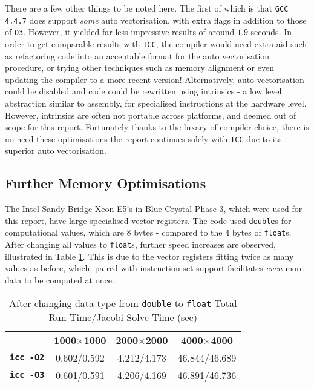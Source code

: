 \documentclass[10pt,twocolumn,a4paper]{article}
\def\tm{\texttrademark\xspace}
\begin{document}
There are a few other things to be noted here. The first of which is that \texttt{GCC 4.4.7} does support \textit{some} auto vectorisation, with extra flags in addition to those of \texttt{O3}. However, it yielded far less impressive results of around $1.9$ seconds. In order to get comparable results with \texttt{ICC}, the compiler would need extra aid such as refactoring code into an acceptable format for the auto vectorisation procedure, or trying other techniques such as memory alignment or even updating the compiler to a more recent version! Alternatively, auto vectorisation could be disabled and code could be rewritten using intrinsics - a low level abstraction similar to assembly, for specialised instructions at the hardware level. However, intrinsics are often not portable across platforms, and deemed out of scope for this report. Fortunately thanks to the luxary of compiler choice, there is no need these optimisations the report continues solely with \texttt{ICC} due to its superior auto vectorisation.

\subsection{Further Memory Optimisations}
The Intel\tm Sandy Bridge Xeon E5's in Blue Crystal Phase 3, which were used for this report, have large specialised vector registers. The code used  \texttt{double}s for computational values, which are 8 bytes - compared to the 4 bytes of \texttt{float}s. After changing all values to \texttt{float}s, further speed increases are observed, illustrated in Table \ref{floats}. This is due to the vector registers fitting twice as many values as before, which, paired with instruction set support facilitates \textit{even} more data to be computed at once. \par

\begin{table}[b]
\small
\centering
\begin{tabular}{l|c|c|c}
    & \textbf{1000$\times$1000} & \textbf{2000$\times$2000} & \textbf{4000$\times$4000}   \\
\textbf{\texttt{icc -O2}} & 0.602/0.592 & 4.212/4.173 & 46.844/46.689 \\
\textbf{\texttt{icc -O3}} & 0.601/0.591 & 4.206/4.169 & 46.891/46.736 \\
\end{tabular}
\caption{After changing data type from \texttt{double} to \texttt{float} Total Run Time/Jacobi Solve Time (sec)}
\label{floats}
\end{table}\par
\end{document}
